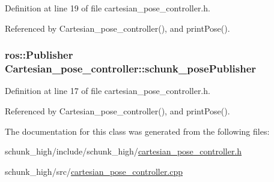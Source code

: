 Definition at line 19 of file cartesian\-\_\-pose\-\_\-controller.\-h.



Referenced by Cartesian\-\_\-pose\-\_\-controller(), and print\-Pose().

\hypertarget{classCartesian__pose__controller_a9eb38e771e5006950b9a8075a0ea7e49}{
\subsubsection[{schunk\-\_\-pose\-Publisher}]{\setlength{\rightskip}{0pt plus 5cm}ros\-::\-Publisher Cartesian\-\_\-pose\-\_\-controller\-::schunk\-\_\-pose\-Publisher\hspace{0.3cm}{\ttfamily [private]}}}\label{classCartesian__pose__controller_a9eb38e771e5006950b9a8075a0ea7e49}


Definition at line 17 of file cartesian\-\_\-pose\-\_\-controller.\-h.



Referenced by Cartesian\-\_\-pose\-\_\-controller(), and print\-Pose().



The documentation for this class was generated from the following files\-:\begin{DoxyCompactItemize}
\item 
schunk\-\_\-high/include/schunk\-\_\-high/\hyperlink{cartesian__pose__controller_8h}{cartesian\-\_\-pose\-\_\-controller.\-h}\item 
schunk\-\_\-high/src/\hyperlink{cartesian__pose__controller_8cpp}{cartesian\-\_\-pose\-\_\-controller.\-cpp}\end{DoxyCompactItemize}

